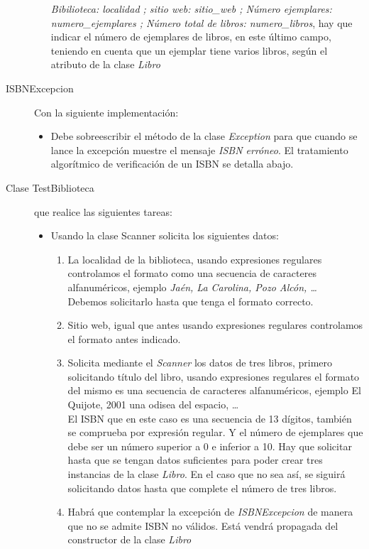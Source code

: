 \documentclass[addpoints,12pt]{exam}
\begin{document}
\begin{questions}
\begin{description}
\begin{itemize}
\emph{Bibilioteca: localidad ; sitio web: sitio\_web  ; Número ejemplares: numero\_ejemplares ; Número total de libros: numero\_libros}, hay que indicar el número de ejemplares de libros, en este último campo, teniendo en cuenta que un ejemplar tiene varios libros, según el atributo de la clase \emph{Libro}
\end{itemize}
\item[ISBNExcepcion] Con la siguiente implementación:
\begin{itemize}
\item Debe sobreescribir el método de la clase \emph{Exception} para que cuando se lance la excepción muestre el mensaje \emph{ISBN erróneo}. El tratamiento algorítmico de verificación de un ISBN se detalla abajo.
\end{itemize}
\item[Clase TestBiblioteca] que realice las siguientes tareas:
\begin{itemize}
\item Usando la clase Scanner solicita los siguientes datos:
\begin{enumerate}
\item La localidad de la biblioteca, usando expresiones regulares controlamos el formato como una secuencia de caracteres alfanuméricos, ejemplo \emph{Jaén, La Carolina, Pozo Alcón, \dots} \\ Debemos solicitarlo hasta que tenga el formato correcto.
\item Sitio web, igual que antes usando expresiones regulares controlamos el formato antes indicado.
\item Solicita mediante el \emph{Scanner} los datos de tres libros, primero solicitando título del libro, usando expresiones regulares el formato del mismo es una secuencia de caracteres alfanuméricos, ejemplo El Quijote, 2001 una odisea del espacio, \dots\\ El ISBN que en este caso es una secuencia de 13 dígitos, también se comprueba por expresión regular. Y el número de ejemplares que debe ser un número superior a 0  e inferior a 10. Hay que solicitar hasta que se tengan datos suficientes para poder crear tres instancias de la clase \emph{Libro}. En el caso que no sea así, se siguirá solicitando datos hasta que complete el número de tres libros.
\item Habrá que contemplar la excepción de \emph{ISBNExcepcion} de manera que no se admite ISBN no válidos. Está vendrá propagada del constructor de la clase \emph{Libro}

\end{enumerate}
\end{itemize}
\end{description}
\end{questions}
\end{document}
